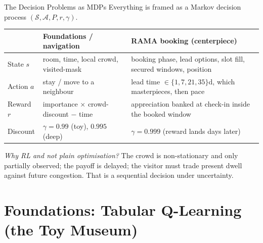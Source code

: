 \documentclass[aspectratio=169, 11pt]{beamer}
\newcommand{\thead}[1]{\textbf{#1}}
\newcommand{\emp}[1]{\textit{#1}}
\begin{document}
\begin{frame}{The Decision Problems as MDPs}
\footnotesize
Everything is framed as a Markov decision process $(\mathcal{S},\mathcal{A},P,r,\gamma)$.
\vspace{0.2em}
\begin{center}
\renewcommand{\arraystretch}{1.25}
\begin{tabular}{p{2.4cm} p{4.0cm} p{4.6cm}}
\toprule
 & \thead{Foundations / navigation} & \thead{RAMA booking (centerpiece)} \\
\midrule
State $s$ & room, time, local crowd, visited-mask & booking phase, lead options, slot fill,
secured windows, position \\
Action $a$ & stay / move to a neighbour & lead time $\in\{1,7,21,35\}$d, which
masterpieces, then pace \\
Reward $r$ & importance $\times$ crowd-discount $-$ time & appreciation banked at
check-in inside the booked window \\
Discount & $\gamma=0.99$ (toy), $0.995$ (deep) & $\gamma=0.999$ (reward lands days later) \\
\bottomrule
\end{tabular}
\end{center}
\vspace{0.3em}
\emp{Why RL and not plain optimisation?} The crowd is non-stationary and only
partially observed; the payoff is delayed; the visitor must trade present dwell
against future congestion. That is a sequential decision under uncertainty.
\end{frame}

\section{Foundations: Tabular Q-Learning (the Toy Museum)}
\end{document}
